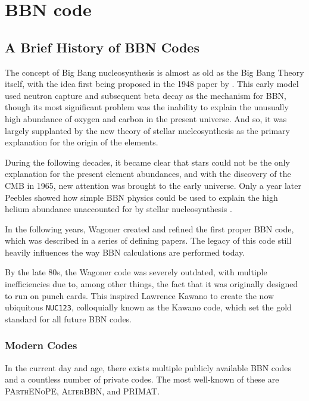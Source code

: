 
\chapter{BBN code}
\label{chap:BBNcode}

\section{A Brief History of BBN Codes}
\label{sec:BBN_history}

The concept of Big Bang nucleosynthesis is almost as old as the Big Bang Theory itself, with the idea first being proposed in the 1948 paper by \textcite{Gamov48}. This early model used neutron capture and subsequent beta decay as the mechanism for BBN, though its most significant problem was the inability to explain the unusually high abundance of oxygen and carbon in the present universe. And so, it was largely supplanted by the new theory of stellar nucleosynthesis as the primary explanation for the origin of the elements. 

During the following decades, it became clear that stars could not be the only explanation for the present element abundances, and with the discovery of the CMB in 1965, new attention was brought to the early universe. 
Only a year later Peebles showed how simple BBN physics could be used to explain the high helium abundance unaccounted for by stellar nucleosynthesis \cite{Peebles66}.

In the following years, Wagoner created and refined the first proper BBN code, which was described in a series of defining papers\cite{Wagoner67}\cite{Wagoner69}\cite{Wagoner72}. The legacy of this code still heavily influences the way BBN calculations are performed today.

By the late 80s, the Wagoner code was severely outdated, with multiple inefficiencies due to, among other things, the fact that it was originally designed to run on punch cards. This inspired Lawrence Kawano to create the now ubiquitous \texttt{NUC123}, colloquially known as the Kawano code\cite{Kawano}, which set the gold standard for all future BBN codes. 

\subsection{Modern Codes}
\label{sec:newcodes}
In the current day and age, there exists multiple publicly available BBN codes and a countless number of private codes. The most well-known of these are \textsc{PArthENoPE}, \textsc{AlterBBN}, and PRIMAT.

